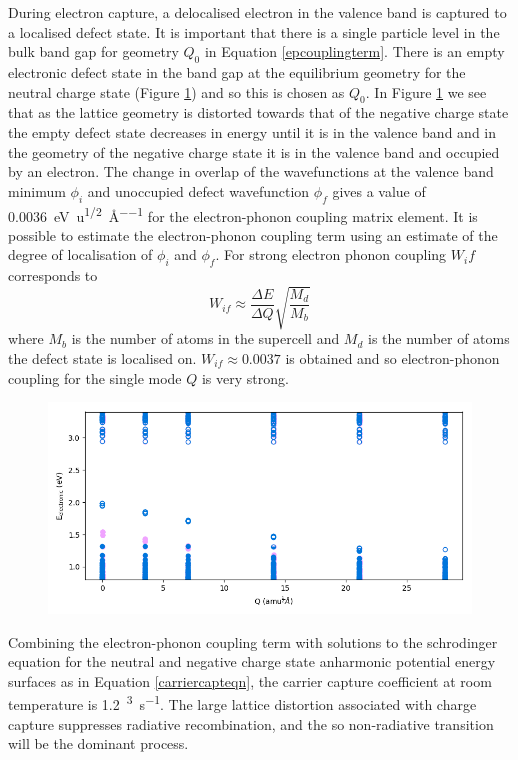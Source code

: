 During electron capture, a delocalised electron in the valence band is captured to a localised defect state. It is important that there is a single particle level in the bulk band gap for geometry $Q_0$ in Equation \ref{epcouplingterm}. There is an empty electronic defect state in the band gap at the equilibrium geometry for the neutral charge state (Figure \ref{eigenvalues}) and so this is chosen as $Q_0$.
\autocite{Alkauskas 2014}
In Figure \ref{eigenvalues} we see that as the lattice geometry is distorted towards that of the negative charge state the empty defect state decreases in energy until it is in the valence band and in the geometry of the negative charge state it is in the valence band and occupied by an electron. 
The change in overlap of the wavefunctions at the valence band minimum $\phi_i$ and unoccupied defect wavefunction $\phi_f$ gives a value of \SI{0.0036}{\electronvolt\per\amu\tothe{1/2}\per\angstrom} for the electron-phonon coupling matrix element.
It is possible to estimate the electron-phonon coupling term using an estimate of the degree of localisation of $\phi_i$ and $\phi_f$. For strong electron phonon coupling $W_if$ corresponds to 
\begin{equation}
W_{if} \approx \frac{\Delta E}{\Delta Q}\sqrt{\frac{M_d}{M_b}}
\end{equation}
where $M_b$ is the number of atoms in the supercell and $M_d$ is the number of atoms the defect state is localised on. $W_{if}\approx0.0037$ is obtained and so electron-phonon coupling for the single mode $Q$ is very strong.

\begin{figure}[h!]   
\centering
  \includegraphics[width=1.0\columnwidth]{figures/ch6/eigs.png}
  \caption[ ]{}
\label{eigenvalues}
\end{figure}

Combining the electron-phonon coupling term with solutions to the schrodinger equation for the neutral and negative charge state anharmonic potential energy surfaces as in Equation \ref{carriercapteqn}, the carrier capture coefficient at room temperature is \SI{1.2}{\centimetre\cubed\per\second}.
The large lattice distortion associated with charge capture suppresses radiative recombination, and the so non-radiative transition will be the dominant process.
\autocite{theory of defects in solids}


